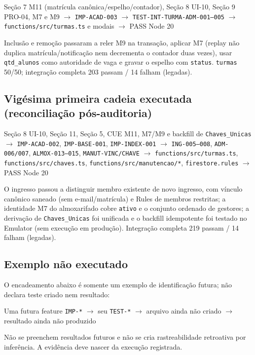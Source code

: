 \begin{center}
Seção 7 M11 (matrícula canônica/espelho/contador), Seção 8 UI-10, Seção 9 PRO-04, M7 e M9
$\rightarrow$ \texttt{IMP-ACAD-003}
$\rightarrow$ \texttt{TEST-INT-TURMA-ADM-001--005}
$\rightarrow$ \nolinkurl{functions/src/turmas.ts} e modais
$\rightarrow$ PASS Node 20
\end{center}

Inclusão e remoção passaram a reler M9 na transação, aplicar M7 (replay não
duplica matrícula/notificação nem decrementa o contador duas vezes), usar
\texttt{qtd\_alunos} como autoridade de vaga e gravar o espelho com
\texttt{status}. \texttt{turmas} 50/50; integração completa 203 passam / 14
falham (legadas).

\subsection{Vigésima primeira cadeia executada (reconciliação pós-auditoria)}

\begin{center}
Seção 8 UI-10, Seção 11, Seção 5, CUE M11, M7/M9 e backfill de \texttt{Chaves\_Unicas}
$\rightarrow$ \texttt{IMP-ACAD-002}, \texttt{IMP-BASE-001}, \texttt{IMP-INDEX-001}
$\rightarrow$ \texttt{ING-005--008}, \texttt{ADM-006/007}, \texttt{ALMOX-013--015}, \texttt{MANUT-VINC/CHAVE}
$\rightarrow$ \nolinkurl{functions/src/turmas.ts}, \nolinkurl{functions/src/chaves.ts}, \nolinkurl{functions/src/manutencao/*}, \nolinkurl{firestore.rules}
$\rightarrow$ PASS Node 20
\end{center}

O ingresso passou a distinguir membro existente de novo ingresso, com vínculo
canônico saneado (sem e-mail/matrícula) e Rules de membros restritas; a
identidade M7 do almoxarifado cobre \texttt{ativo} e o conjunto ordenado de
gestores; a derivação de \texttt{Chaves\_Unicas} foi unificada e o backfill
idempotente foi testado no Emulator (sem execução em produção). Integração
completa 219 passam / 14 falham (legadas).

\subsection{Exemplo não executado}

O encadeamento abaixo é somente um exemplo de identificação futura; não declara
teste criado nem resultado:

\begin{center}
Uma futura feature \texttt{IMP-*} $\rightarrow$ seu \texttt{TEST-*}
$\rightarrow$ arquivo ainda não criado $\rightarrow$ resultado ainda não produzido
\end{center}

Não se preenchem resultados futuros e não se cria rastreabilidade retroativa por
inferência. A evidência deve nascer da execução registrada.
